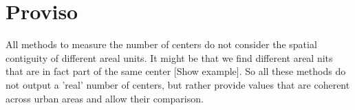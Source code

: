 \section{Proviso}
\label{sec:proviso}

All methods to measure the number of centers do not consider the spatial
contiguity of different areal units. It might be that we find different areal
nits that are in fact part of the same center [Show example]. So all these
methods do not output a 'real' number of centers, but rather provide values that
are coherent across urban areas and allow their comparison.

